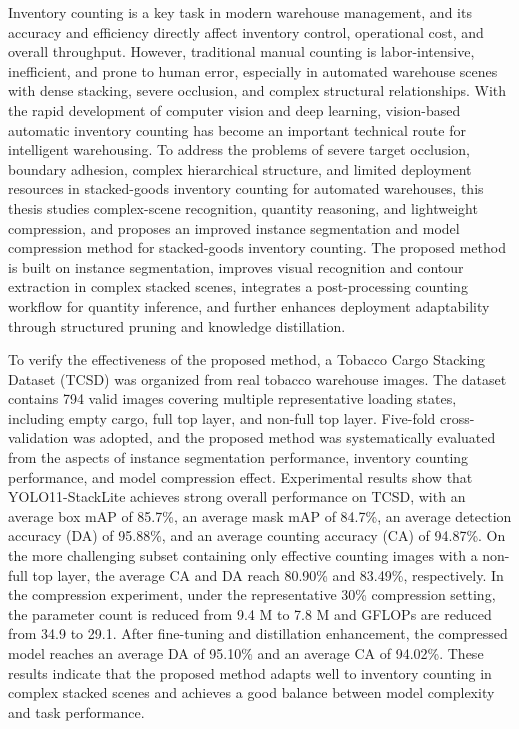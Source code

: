 \begin{abstract*}
Inventory counting is a key task in modern warehouse management, and its accuracy and efficiency directly affect inventory control, operational cost, and overall throughput. However, traditional manual counting is labor-intensive, inefficient, and prone to human error, especially in automated warehouse scenes with dense stacking, severe occlusion, and complex structural relationships. With the rapid development of computer vision and deep learning, vision-based automatic inventory counting has become an important technical route for intelligent warehousing. To address the problems of severe target occlusion, boundary adhesion, complex hierarchical structure, and limited deployment resources in stacked-goods inventory counting for automated warehouses, this thesis studies complex-scene recognition, quantity reasoning, and lightweight compression, and proposes an improved instance segmentation and model compression method for stacked-goods inventory counting. The proposed method is built on instance segmentation, improves visual recognition and contour extraction in complex stacked scenes, integrates a post-processing counting workflow for quantity inference, and further enhances deployment adaptability through structured pruning and knowledge distillation.

To verify the effectiveness of the proposed method, a Tobacco Cargo Stacking Dataset (TCSD) was organized from real tobacco warehouse images. The dataset contains 794 valid images covering multiple representative loading states, including empty cargo, full top layer, and non-full top layer. Five-fold cross-validation was adopted, and the proposed method was systematically evaluated from the aspects of instance segmentation performance, inventory counting performance, and model compression effect. Experimental results show that YOLO11-StackLite achieves strong overall performance on TCSD, with an average box mAP of 85.7\%, an average mask mAP of 84.7\%, an average detection accuracy (DA) of 95.88\%, and an average counting accuracy (CA) of 94.87\%. On the more challenging subset containing only effective counting images with a non-full top layer, the average CA and DA reach 80.90\% and 83.49\%, respectively. In the compression experiment, under the representative 30\% compression setting, the parameter count is reduced from 9.4 M to 7.8 M and GFLOPs are reduced from 34.9 to 29.1. After fine-tuning and distillation enhancement, the compressed model reaches an average DA of 95.10\% and an average CA of 94.02\%. These results indicate that the proposed method adapts well to inventory counting in complex stacked scenes and achieves a good balance between model complexity and task performance.


\end{abstract*}
